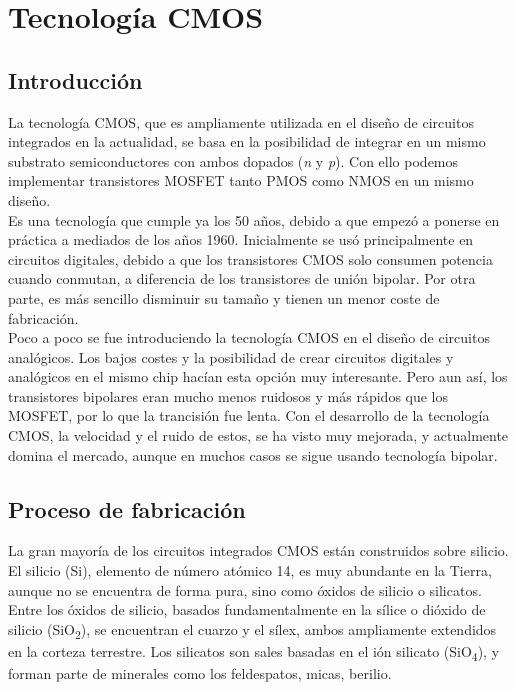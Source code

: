 \chapter{Tecnología CMOS}\label{cap:tecnologia_cmos}

\section{Introducción}\label{cap:intro_cmos}

La tecnología CMOS, que es ampliamente utilizada en el diseño de circuitos integrados
en la actualidad, se basa en la posibilidad de integrar en un mismo substrato
semiconductores con ambos dopados (\textit{n} y \textit{p}). Con ello podemos implementar transistores
MOSFET tanto PMOS como NMOS en un mismo diseño.\\

Es una tecnología que cumple ya los
50 años, debido a que empezó a ponerse en práctica a mediados de los años 1960.
Inicialmente se usó principalmente en circuitos digitales, debido a que los
transistores CMOS solo consumen potencia cuando conmutan, a diferencia de los
transistores de unión bipolar. Por otra parte, es más sencillo disminuir su tamaño
y tienen un menor coste de fabricación.\cite{Razavi2016}\\

Poco a poco se fue introduciendo la tecnología CMOS en el diseño de circuitos
analógicos. Los bajos costes y la posibilidad de crear circuitos digitales y
analógicos en el mismo chip hacían esta opción muy interesante. Pero aun así, los
transistores bipolares eran mucho menos ruidosos y más rápidos que los MOSFET, por
lo que la trancisión fue lenta. Con el desarrollo de la tecnología CMOS, la velocidad
y el ruido de estos, se ha visto muy mejorada, y actualmente domina el mercado,
aunque en muchos casos se sigue usando tecnología bipolar.\\

\section{Proceso de fabricación}\label{cap:fabricacion}

La gran mayoría de los circuitos integrados CMOS están construidos sobre silicio.
El silicio (Si), elemento de número atómico 14, es muy abundante en la Tierra, aunque
no se encuentra de forma pura, sino como óxidos de silicio o silicatos. Entre los
óxidos de silicio, basados fundamentalmente en la sílice o dióxido de silicio
(SiO\textsubscript{2}), se encuentran el cuarzo y el sílex, ambos ampliamente extendidos
en la corteza terrestre. Los silicatos son sales basadas en el ión silicato (SiO\textsubscript{4}),
y forman parte de minerales como los feldespatos, micas, berilio.\\

